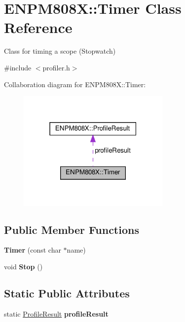 \hypertarget{class_e_n_p_m808_x_1_1_timer}{}\section{E\+N\+P\+M808X\+:\+:Timer Class Reference}
\label{class_e_n_p_m808_x_1_1_timer}


Class for timing a scope (Stopwatch)  




{\ttfamily \#include $<$profiler.\+h$>$}



Collaboration diagram for E\+N\+P\+M808X\+:\+:Timer\+:
\nopagebreak
\begin{figure}[H]
\begin{center}
\leavevmode
\includegraphics[width=211pt]{class_e_n_p_m808_x_1_1_timer__coll__graph}
\end{center}
\end{figure}
\subsection*{Public Member Functions}
\begin{DoxyCompactItemize}
\item 
\mbox{\label{class_e_n_p_m808_x_1_1_timer_a15c3a571ee66f6e63bfbd29bebe79051}} 
{\bfseries Timer} (const char $\ast$name)
\item 
\mbox{\label{class_e_n_p_m808_x_1_1_timer_a1c9db92154efd95fbce0a04eaba25d21}} 
void {\bfseries Stop} ()
\end{DoxyCompactItemize}
\subsection*{Static Public Attributes}
\begin{DoxyCompactItemize}
\item 
\mbox{\label{class_e_n_p_m808_x_1_1_timer_a70ffc132dae5dc5e2eb83542be8f2970}} 
static \hyperlink{struct_e_n_p_m808_x_1_1_profile_result}{Profile\+Result} {\bfseries profile\+Result}
\end{DoxyCompactItemize}


